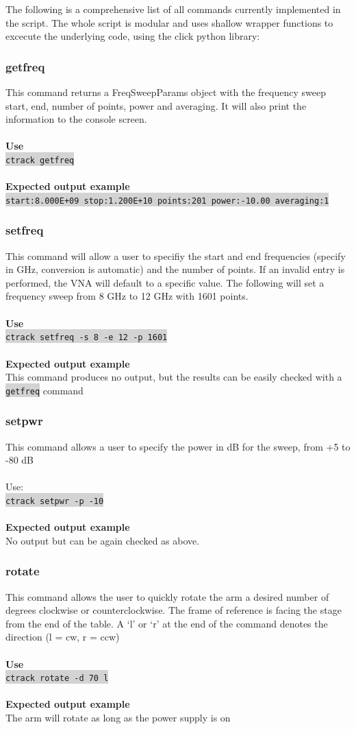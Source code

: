 \documentclass[hidelinks]{article}
\newcommand{\code}[1]{\colorbox{lightgray}{\texttt{#1}}}
\begin{document}
The following is a comprehensive list of all commands currently implemented in the script. The whole script is modular and uses shallow wrapper functions to excecute the underlying code, using the click python library:
\subsubsection{getfreq}
This command returns a FreqSweepParams object with the frequency sweep start, end, number of points, power and averaging. It will also print the information to the console screen.
\\\\\textbf{Use}\\
\code{ctrack getfreq}\\\\
\textbf{Expected output example}\\
\code{start:8.000E+09 stop:1.200E+10 points:201 power:-10.00 averaging:1}
\subsubsection{setfreq}
This command will allow a user to specifiy the start and end frequencies (specify in GHz, conversion is automatic) and the number of points. If an invalid entry is performed, the VNA will default to a specific value. The following will set a frequency sweep from 8 GHz to 12 GHz with 1601 points.
\\\\\textbf{Use}\\
\code{ctrack setfreq -s 8 -e 12 -p 1601}\\\\
\textbf{Expected output example}\\
This command produces no output, but the results can be easily checked with a \code{getfreq} command
\subsubsection{setpwr}
This command allows a user to specify the power in dB for the sweep, from +5 to -80 dB
\\\\Use:\\
\code{ctrack setpwr -p -10}\\\\
\textbf{Expected output example}\\
No output but can be again checked as above.
\subsubsection{rotate}
This command allows the user to quickly rotate the arm a desired number of degrees clockwise or counterclockwise. The frame of reference is facing the stage from the end of the table. A `l' or `r' at the end of the command denotes the direction (l = cw, r = ccw)
\\\\\textbf{Use}\\
\code{ctrack rotate -d 70 l}\\\\
\textbf{Expected output example}\\
The arm will rotate as long as the power supply is on
\end{document}
